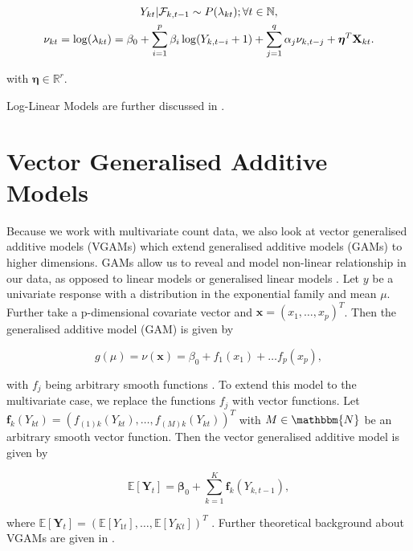 \begin{gather}
Y_{kt} | \mathcal{F}_{k,t-1} \sim P(\lambda_{kt}); \forall t \in \mathbb{N}, \\
\nu_{kt}= \log(\lambda_{kt}) = \beta_0 + \sum_{i=1}^p\beta_i \log(Y_{k,t-i}+1) + \sum_{j=1}^q\alpha_j \nu_{k,t-j} + \bm{\eta}^T\textbf{X}_{kt}.
\label{eq:Log-Linear model external factors}
\end{gather}

with $\bm{\eta} \in \mathbb{R}^r$. 

Log-Linear Models are further discussed in \cite{Fokianos:2011,Woodard:2011,Douc:2013}.


\section{Vector Generalised Additive Models}
\label{sec:Vgam}

Because we work with multivariate count data, we also look at vector generalised additive models (VGAMs) which extend generalised additive models (GAMs) to higher dimensions. GAMs allow us to reveal and model non-linear relationship in our data, as opposed to linear models or generalised linear models \cite{Yee:1996}. Let $y$ be a univariate response with a distribution in the exponential family and mean $\mu$. Further take a p-dimensional covariate vector and $\bm{x}=(x_1,\ldots,x_p)^T$. Then the generalised additive model (GAM) is given by

\begin{equation}
g(\mu) = \nu(\bm{x}) = \beta_0 + f_1(x_1) + \ldots f_p(x_p),
\label{eq:Gam}
\end{equation}

with $f_j$ being arbitrary smooth functions \cite{Yee:1996}.
To extend this model to the multivariate case, we replace the functions $f_j$ with vector functions. Let $\bm{f}_k(Y_{kt}) = (f_{(1)k}(Y_{kt}),\ldots,f_{(M)k}(Y_{kt}))^T$ with $M \in \mathbbm{N}$ be an arbitrary smooth vector function. Then the vector generalised additive model is given by

\begin{equation}
\mathbb{E}[\bm{Y}_t] = \bm{\beta}_0 + \sum_{k=1}^K\bm{f}_k(Y_{k,t-1}),
\label{eq:Vgam}
\end{equation}

where $\mathbb{E}[\bm{Y}_t] = (\mathbb{E}[Y_{1t}],\ldots,\mathbb{E}[Y_{Kt}])^T$ \cite{Yee:1996}. Further theoretical background about VGAMs are given in \cite{Yee:1996,Yee:2015,Wood:2004}.


